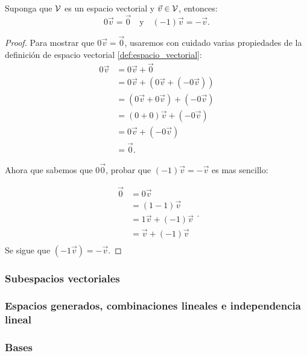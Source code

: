 \begin{theorem}
	Suponga que \(\mathcal{V}\) es un espacio vectorial y \(\vec{v} \in \mathcal{V}\), entonces:
	\[ 0 \vec{v} = \vec{0} \quad \text{y} \quad	(-1) \vec{v} = -\vec{v} .\]
\end{theorem}

\begin{proof}
	Para mostrar que \(0 \vec{v} = \vec{0}\), usaremos con cuidado varias
	propiedades de la definición de espacio vectorial 
	\ref{def:espacio_vectorial}:
	\[ \begin{aligned}
		0 \vec{v} &= 0 \vec{v} + \vec{0} \\
			&= 0 \vec{v} + (0 \vec{v} + (- 0 \vec{v})) \\
			&= (0 \vec{v} + 0 \vec{v}) + (-0 \vec{v})\\
			&= (0 + 0) \vec{v} + (-0\vec{v}) \\
			&= 0\vec{v} + (-0\vec{v}) \\
			&= \vec{0}.
	\end{aligned} \]

	Ahora que sabemos que \(0 \vec{0}\), probar que \((-1)\vec{v} = -\vec{v}\)
	es mas sencillo:

	\[ \begin{aligned}
		\vec{0} &= 0\vec{v} \\
			&= (1 - 1) \vec{v} \\
			&= 1\vec{v} + (-1) \vec{v} \\
			&= \vec{v} + (-1)\vec{v} \\
	\end{aligned} .\]
	Se sigue que \((-1\vec{v}) = -\vec{v}\).
 \end{proof}

\subsubsection{Subespacios vectoriales} %
\label{ssub:subespacios vectoriales}

\subsubsection{Espacios generados, combinaciones lineales e independencia
 lineal} %
\label{ssub:espacios_generados_combinaciones_lineales_e_independencia_lineal}

\subsubsection{Bases} %
\label{ssub:bases}

